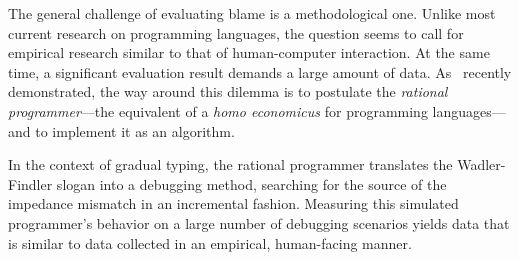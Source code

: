 
The general challenge of evaluating blame is a methodological one. Unlike most
current research on programming languages, the question seems to call for
empirical research similar to that of human-computer interaction. At the same
time, a significant evaluation result demands a large amount of
data. As~\citet{lksfd-popl-2020} recently demonstrated, the way around this
dilemma is to postulate the {\em rational programmer\/}---the equivalent of a
{\it homo economicus\/} for programming languages---and to implement it as an algorithm.

In the context of gradual typing, the rational programmer translates the
Wadler-Findler slogan into a debugging method, searching for the source of the
impedance mismatch in an incremental fashion. Measuring this simulated
programmer's behavior on a large number of debugging scenarios yields data that
is similar to data collected in an empirical, human-facing manner.


